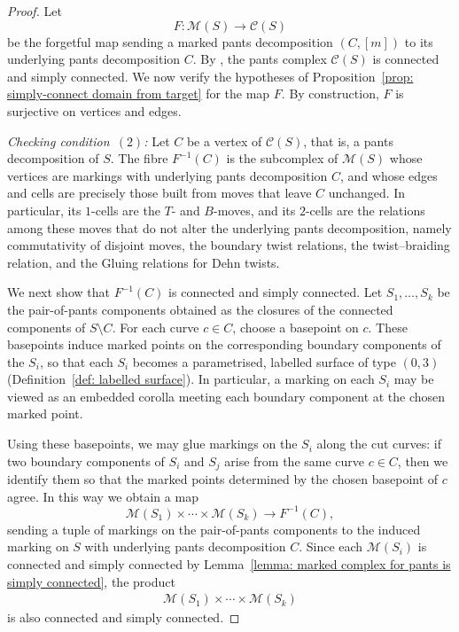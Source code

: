 \documentclass{amsart}
\newcommand{\pantscpx}{\mathcal{C}}
\newcommand{\markS}{\mathcal{M}(S)}
\theoremstyle{definition}
\numberwithin{equation}{section}
\begin{document}
\begin{proof}
Let
\[
F:\markS\longrightarrow \pantscpx(S)
\]
be the forgetful map sending a marked pants decomposition $(C,[m])$ to its underlying pants decomposition $C$. By \cite[Theorem~2]{hls}, the pants complex $\pantscpx(S)$ is connected and simply connected. We now verify the hypotheses of Proposition~\ref{prop: simply-connect domain from target} for the map $F$. By construction, $F$ is surjective on vertices and edges.

\emph{Checking condition~$(2)$:} Let $C$ be a vertex of $\pantscpx(S)$, that is, a pants decomposition of $S$. The fibre $F^{-1}(C)$ is the subcomplex of $\markS$ whose vertices are markings with underlying pants decomposition $C$, and whose edges and cells are precisely those built from moves that leave $C$ unchanged. In particular, its $1$-cells are the $T$- and $B$-moves, and its $2$-cells are the relations among these moves that do not alter the underlying pants decomposition, namely commutativity of disjoint moves, the boundary twist relations, the twist--braiding relation, and the Gluing relations for Dehn twists.

We next show that $F^{-1}(C)$ is connected and simply connected. Let $S_1,\dots,S_k$ be the pair-of-pants components obtained as the closures of the connected components of $S\setminus C$. For each curve $c\in C$, choose a basepoint on $c$. These basepoints induce marked points on the corresponding boundary components of the $S_i$, so that each $S_i$ becomes a parametrised, labelled surface of type $(0,3)$ (Definition~\ref{def: labelled surface}). In particular, a marking on each $S_i$ may be viewed as an embedded corolla meeting each boundary component at the chosen marked point.

Using these basepoints, we may glue markings on the $S_i$ along the cut curves: if two boundary components of $S_i$ and $S_j$ arise from the same curve $c\in C$, then we identify them so that the marked points determined by the chosen basepoint of $c$ agree. In this way we obtain a map
\[
\mathcal M(S_1)\times\cdots\times \mathcal M(S_k)\longrightarrow F^{-1}(C),
\]
sending a tuple of markings on the pair-of-pants components to the induced marking on $S$ with underlying pants decomposition $C$. Since each $\mathcal M(S_i)$ is connected and simply connected by Lemma~\ref{lemma: marked complex for pants is simply connected}, the product
    \begin{align}\label{eq:gluing-map-for-markings}
        \mathcal M(S_1)\times\cdots\times \mathcal M(S_k)
    \end{align}
is also connected and simply connected.


\end{proof}
\end{document}

